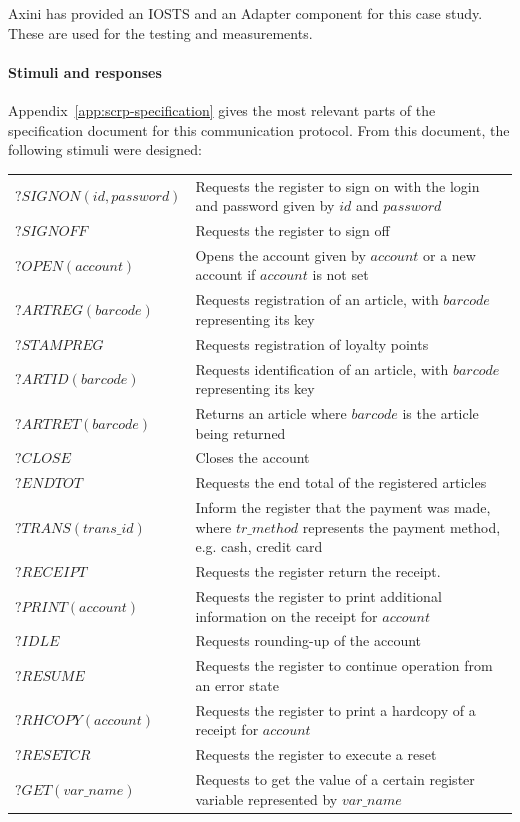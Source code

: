 Axini has provided an IOSTS and an Adapter component for this case study. These are used for the testing and measurements.

\paragraph*{Stimuli and responses}
Appendix~\ref{app:scrp-specification} gives the most relevant parts of the specification document for this communication protocol. From this document, the following stimuli were designed:
\vspace{5px} \\
\begin{tabular}{lp{280px}} 
$\mathit{?SIGNON(id, password)}$ & Requests the register to sign on with the login and password given by $\mathit{id}$ and $\mathit{password}$\\
$\mathit{?SIGNOFF}$ & Requests the register to sign off\\
$\mathit{?OPEN(account)}$ & Opens the account given by $\mathit{account}$ or a new account if $\mathit{account}$ is not set\\
$\mathit{?ARTREG(barcode)}$ & Requests registration of an article, with $\mathit{barcode}$ representing its key \\
$\mathit{?STAMPREG}$ & Requests registration of loyalty points \\
$\mathit{?ARTID(barcode)}$ & Requests identification of an article, with $\mathit{barcode}$ representing its key\\
$\mathit{?ARTRET(barcode)}$ & Returns an article where $\mathit{barcode}$ is the article being returned \\
$\mathit{?CLOSE}$ & Closes the account\\
$\mathit{?ENDTOT}$ & Requests the end total of the registered articles\\
$\mathit{?TRANS(trans\_id)}$ & Inform the register that the payment was made, where $\mathit{tr\_method}$ represents the payment method, e.g. cash, credit card\\
$\mathit{?RECEIPT}$ & Requests the register return the receipt.\\
$\mathit{?PRINT(account)}$ & Requests the register to print additional information on the receipt for $\mathit{account}$\\
$\mathit{?IDLE}$ & Requests rounding-up of the account\\
$\mathit{?RESUME}$ & Requests the register to continue operation from an error state\\
$\mathit{?RHCOPY(account)}$ & Requests the register to print a hardcopy of a receipt for $\mathit{account}$\\
$\mathit{?RESETCR}$ & Requests the register to execute a reset \\
$\mathit{?GET(var\_name)}$ & Requests to get the value of a certain register variable represented by $\mathit{var\_name}$
\end{tabular}


